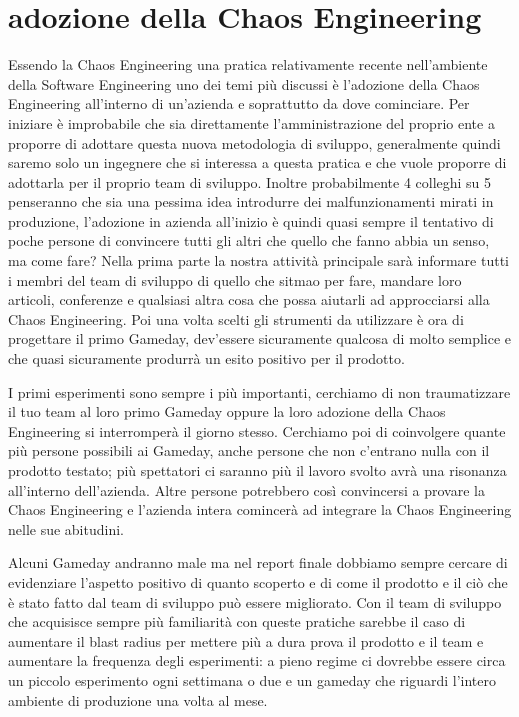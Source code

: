 \section{adozione della Chaos Engineering}
Essendo la Chaos Engineering una pratica relativamente recente nell'ambiente della Software Engineering uno dei temi più discussi è l'adozione della Chaos Engineering all'interno di un'azienda e soprattutto da dove cominciare.
Per iniziare è improbabile che sia direttamente l'amministrazione del proprio ente a proporre di adottare questa nuova metodologia di sviluppo, generalmente quindi saremo solo un ingegnere che si interessa a questa pratica e che vuole proporre di adottarla per il proprio team di sviluppo.
Inoltre probabilmente 4 colleghi su 5 penseranno che sia una pessima idea introdurre dei malfunzionamenti mirati in produzione, l'adozione in azienda all'inizio è quindi quasi sempre il tentativo di poche persone di convincere tutti gli altri che quello che fanno abbia un senso, ma come fare?
Nella prima parte la nostra attività principale sarà informare tutti i membri del team di sviluppo di quello che sitmao per fare, mandare loro articoli, conferenze e qualsiasi altra cosa che possa aiutarli ad approcciarsi alla Chaos Engineering.
Poi una volta scelti gli strumenti da utilizzare è ora di progettare il primo Gameday, dev'essere sicuramente qualcosa di molto semplice e che quasi sicuramente produrrà un esito positivo per il prodotto.

I primi esperimenti sono sempre i più importanti, cerchiamo di non traumatizzare il tuo team al loro primo Gameday oppure la loro adozione della Chaos Engineering si interromperà il giorno stesso.
Cerchiamo poi di coinvolgere quante più persone possibili ai Gameday, anche persone che non c'entrano nulla con il prodotto testato; più spettatori ci saranno più il lavoro svolto avrà una risonanza all'interno dell'azienda.
Altre persone potrebbero così convincersi a provare la Chaos Engineering e l'azienda intera comincerà ad integrare la Chaos Engineering nelle sue abitudini.

Alcuni Gameday andranno male ma nel report finale dobbiamo sempre cercare di evidenziare l'aspetto positivo di quanto scoperto e di come il prodotto e il ciò che è stato fatto dal team di sviluppo può essere migliorato.
Con il team di sviluppo che acquisisce sempre più familiarità con queste pratiche sarebbe il caso di aumentare il blast radius per mettere più a dura prova il prodotto e il team e aumentare la frequenza degli esperimenti: a pieno regime ci dovrebbe essere circa un piccolo esperimento ogni settimana o due e un gameday che riguardi l'intero ambiente di produzione una volta al mese.

